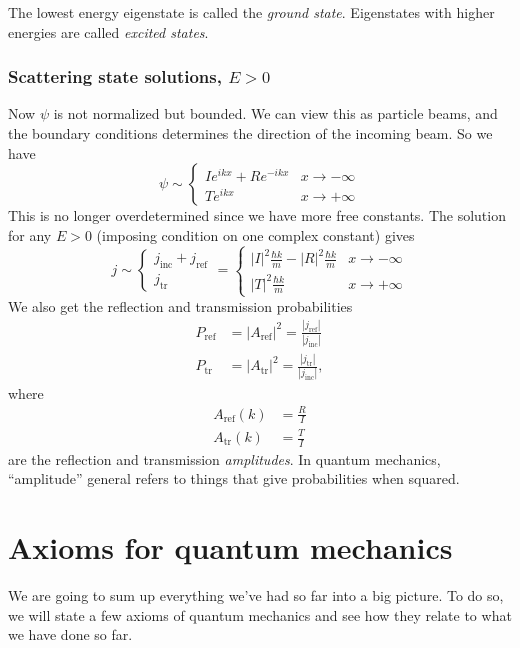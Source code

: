 \documentclass[a4paper]{article}
\begin{document}
\begin{defi}
  The lowest energy eigenstate is called the \emph{ground state}. Eigenstates with higher energies are called \emph{excited states}.
\end{defi}

\subsubsection*{Scattering state solutions, \texorpdfstring{$E > 0$}{E }}
Now $\psi$ is not normalized but bounded. We can view this as particle beams, and the boundary conditions determines the direction of the incoming beam. So we have
\[
  \psi \sim
  \begin{cases}
    I e^{ikx} + R e^{-ikx} & x \to -\infty\\
    Te^{ikx} & x \to +\infty
  \end{cases}
\]
This is no longer overdetermined since we have more free constants. The solution for any $E > 0$ (imposing condition on one complex constant) gives
\[
  j \sim
  \begin{cases}
    j_{\mathrm{inc}} + j_{\mathrm{ref}}\\
    j_{\mathrm{tr}}
  \end{cases}
  =
  \begin{cases}
    |I|^2 \frac{\hbar k}{m} - |R|^2 \frac{\hbar k}{m} & x \to -\infty\\
    |T|^2 \frac{\hbar k}{m} & x \to +\infty
  \end{cases}
\]
We also get the reflection and transmission probabilities
\begin{align*}
  P_{\mathrm{ref}} &= |A_{\mathrm{ref}}|^2 = \frac{|j_{\mathrm{ref}}|}{|j_{\mathrm{inc}}|}\\
  P_{\mathrm{tr}} &= |A_{\mathrm{tr}}|^2 = \frac{|j_{\mathrm{tr}}|}{|j_{\mathrm{inc}}|},
\end{align*}
where
\begin{align*}
  A_{\mathrm{ref}}(k) &= \frac{R}{I} \\
  A_{\mathrm{tr}}(k) &= \frac{T}{I}
\end{align*}
are the reflection and transmission \emph{amplitudes}. In quantum mechanics, ``amplitude'' general refers to things that give probabilities when squared.

\section{Axioms for quantum mechanics}
We are going to sum up everything we've had so far into a big picture. To do so, we will state a few axioms of quantum mechanics and see how they relate to what we have done so far.
\end{document}
